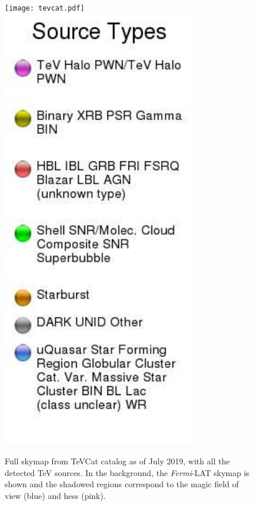 \documentclass[main.tex]{subfiles}
\begin{document}
\begin{figure}[!htb]
\texttt{[image: tevcat.pdf]}
\endminipage\hfill
{}
\includegraphics[width=\linewidth]{Pictures/legend_tevcat.pdf}
\endminipage\hfill
\caption{\label{fig:tevcat}Full skymap from TeVCat\cite{2008tevcat} catalog as of July 2019, with all the detected TeV sources. In the background, the \textit{Fermi}-LAT skymap is shown and the shadowed regions correspond to the \gls{magic} field of view (blue) and \gls{hess} (pink). }
\end{figure}
\end{document}
